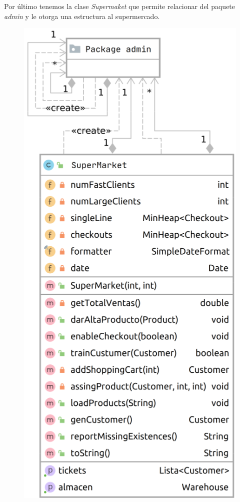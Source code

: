 \documentclass[letterpaper,11pt]{article}
\begin{document}
\newpage

Por último tenemos la clase \textit{Supermaket } que permite relacionar del paquete \textit{admin} y le otorga una estructura al supermercado.
\begin{figure}[htb]
	\centering
	\includegraphics[scale=.31]{supermarket_diagram.png}
\end{figure}
\end{document}
